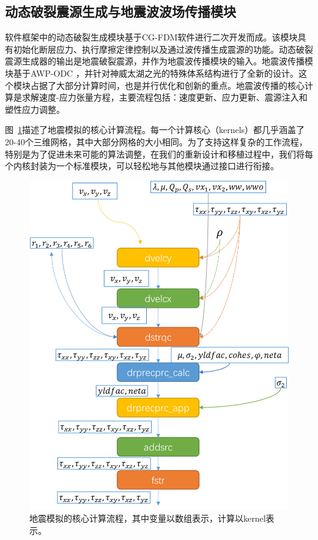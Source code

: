 \documentclass[degree=doctor]{thuthesis}
\begin{document}
\subsection{动态破裂震源生成与地震波波场传播模块}

软件框架中的动态破裂生成模块基于CG-FDM软件\citep{zhang2014three}进行二次开发而成。该模块具有初始化断层应力、执行摩擦定律控制以及通过波传播生成震源的功能。动态破裂震源生成器的输出是地震破裂震源，并作为地震波传播模块的输入。地震波传播模块基于AWP-ODC \citep {cui2010scalable}，并针对神威太湖之光的特殊体系结构进行了全新的设计。这个模块占据了大部分计算时间，也是并行优化和创新的重点。地震波传播的核心计算是求解速度-应力张量方程，主要流程包括：速度更新、应力更新、震源注入和塑性应力调整。

图~\ref{fig:awp-workflow}描述了地震模拟的核心计算流程。每一个计算核心（kernels）都几乎涵盖了20-40个三维网格，其中大部分网格的大小相同。为了支持这样复杂的工作流程，特别是为了促进未来可能的算法调整，在我们的重新设计和移植过程中，我们将每个内核封装为一个标准模块，可以轻松地与其他模块通过接口进行衔接。

\begin{figure}[ht]
\centering
\includegraphics[width=0.8\columnwidth]{awp_chart.jpg}
\caption{地震模拟的核心计算流程，其中变量以数组表示，计算以kernel表示。}
\label{fig:awp-workflow}
\end{figure}
\end{document}
